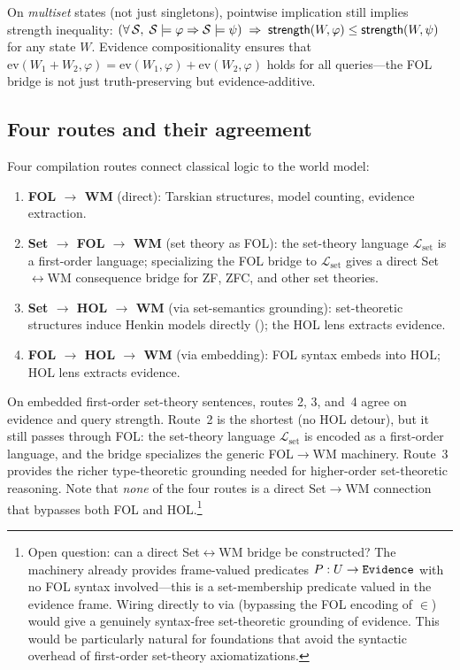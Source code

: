 \documentclass[11pt,openany]{report}
\begin{document}
\noindent
On \emph{multiset} states (not just singletons), pointwise
implication still implies strength inequality:
$(\forall\, \mathcal{S},\; \mathcal{S} \models \varphi \Rightarrow
\mathcal{S} \models \psi)
\;\Rightarrow\; \mathsf{strength}(W, \varphi) \le \mathsf{strength}(W, \psi)$
for any state $W$.  Evidence compositionality ensures that
$\mathrm{ev}(W_1 + W_2, \varphi) = \mathrm{ev}(W_1, \varphi) +
\mathrm{ev}(W_2, \varphi)$ holds for all queries---the FOL bridge
is not just truth-preserving but evidence-additive.

\subsection{Four routes and their agreement}

Four compilation routes connect classical logic to the world model:
\begin{enumerate}
\item \textbf{FOL $\to$ WM} (direct): Tarskian structures, model
  counting, evidence extraction.
\item \textbf{Set $\to$ FOL $\to$ WM} (set theory as FOL): the
  set-theory language $\mathcal{L}_{\mathrm{set}}$ is a first-order
  language; specializing the FOL bridge to $\mathcal{L}_{\mathrm{set}}$
  gives a direct Set$\leftrightarrow$WM consequence bridge for ZF,
  ZFC, and other set theories.
\item \textbf{Set $\to$ HOL $\to$ WM} (via set-semantics grounding):
  set-theoretic structures induce Henkin models directly
  (); the HOL lens extracts evidence.
\item \textbf{FOL $\to$ HOL $\to$ WM} (via embedding): FOL syntax
  embeds into HOL; HOL lens extracts evidence.
\end{enumerate}

\noindent
On embedded first-order set-theory sentences, routes 2, 3, and~4 agree
on evidence and query strength.  Route~2 is the shortest (no HOL
detour), but it still passes through FOL: the set-theory language
$\mathcal{L}_{\mathrm{set}}$ is encoded as a first-order language,
and the bridge specializes the generic FOL$\to$WM machinery.
Route~3 provides the richer type-theoretic grounding needed for
higher-order set-theoretic reasoning.  Note that \emph{none} of the
four routes is a direct Set$\to$WM connection that bypasses both FOL
and HOL.\footnote{Open question: can a direct Set$\leftrightarrow$WM
bridge be constructed?  The  machinery already
provides frame-valued predicates $P : U \to \mathtt{Evidence}$ with no FOL
syntax involved---this is a set-membership predicate valued in
the evidence frame.  Wiring  directly to
 via  (bypassing the FOL
encoding of $\in$) would give a genuinely syntax-free
set-theoretic grounding of evidence.  This would be particularly
natural for foundations that avoid the syntactic overhead of
first-order set-theory axiomatizations.}
\end{document}
